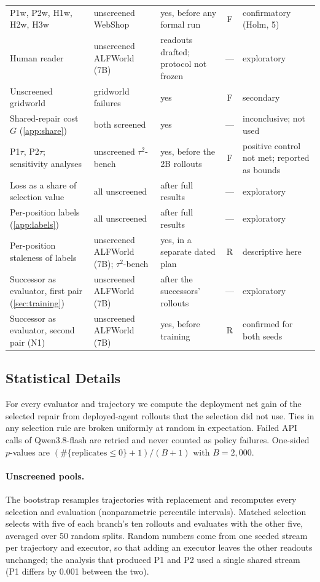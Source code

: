 \documentclass{article}
\newcommand{\tautwo}{$\tau^2$-bench}
\theoremstyle{plain}
\theoremstyle{definition}
\theoremstyle{remark}
\begin{document}
\begin{table}[t]
\begin{tabular}{@{}>{\raggedright\arraybackslash}p{}>{\raggedright\arraybackslash}p{}>{\raggedright\arraybackslash}p{}c>{\raggedright\arraybackslash}p{}@{}}
    P1w, P2w, H1w, H2w, H3w & unscreened WebShop & yes, before any formal run & F & confirmatory (Holm, 5) \\
    Human reader & unscreened ALFWorld (7B) & readouts drafted; protocol not frozen & --- & exploratory \\
    Unscreened gridworld & 100 gridworld failures & yes & F & secondary \\
    Shared-repair cost $G$ (\cref{app:share}) & both screened & yes & --- & inconclusive; not used \\
    P1$\tau$, P2$\tau$; sensitivity analyses & unscreened \tautwo{} & yes, before the 2B rollouts & F & positive control not met; reported as bounds \\
    Loss as a share of selection value & all unscreened & after full results & --- & exploratory \\
    Per-position labels (\cref{app:labels}) & all unscreened & after full results & --- & exploratory \\
    Per-position staleness of labels & unscreened ALFWorld (7B); \tautwo{} & yes, in a separate dated plan & R & descriptive here \\
    Successor as evaluator, first pair (\cref{sec:training}) & unscreened ALFWorld (7B) & after the successors' rollouts & --- & exploratory \\
    Successor as evaluator, second pair (N1) & unscreened ALFWorld (7B) & yes, before training & R & confirmed for both seeds \\
    \bottomrule
  \end{tabular}
\end{table}

\subsection{Statistical Details}
\label{app:stats}

For every evaluator and trajectory we compute the deployment net gain of the selected repair from deployed-agent rollouts that the selection did not use. Ties in any selection rule are broken uniformly at random in expectation. Failed API calls of Qwen3.8-flash are retried and never counted as policy failures. One-sided $p$-values are $(\#\{\text{replicates}\le0\}+1)/(B+1)$ with $B=2{,}000$.

\paragraph{Unscreened pools.} The bootstrap resamples trajectories with replacement and recomputes every selection and evaluation (nonparametric percentile intervals). Matched selection selects with five of each branch's ten rollouts and evaluates with the other five, averaged over 50 random splits. Random numbers come from one seeded stream per trajectory and executor, so that adding an executor leaves the other readouts unchanged; the analysis that produced P1 and P2 used a single shared stream (P1 differs by 0.001 between the two).
\end{document}
